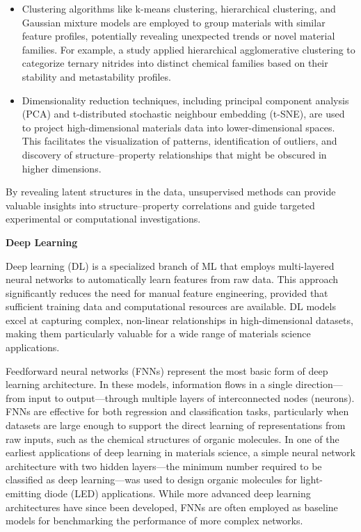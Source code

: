 \begin{itemize}
    \item Clustering algorithms like k-means clustering, hierarchical clustering, and Gaussian mixture models are employed to group materials with similar feature profiles, potentially revealing unexpected trends or novel material families\cite{RN571,RN555}. For example, a study applied hierarchical agglomerative clustering to categorize ternary nitrides into distinct chemical families based on their stability and metastability profiles\cite{RN555}.
    \item Dimensionality reduction techniques, including principal component analysis (PCA) and t-distributed stochastic neighbour embedding (t-SNE), are used to project high-dimensional materials data into lower-dimensional spaces. This facilitates the visualization of patterns, identification of outliers, and discovery of structure–property relationships that might be obscured in higher dimensions\cite{RN412,RN574,RN551}.
\end{itemize}

By revealing latent structures in the data, unsupervised methods can provide valuable insights into structure–property correlations and guide targeted experimental or computational investigations.

\textbf{Deep Learning}

Deep learning (DL) is a specialized branch of ML that employs multi-layered neural networks to automatically learn features from raw data. This approach significantly reduces the need for manual feature engineering, provided that sufficient training data and computational resources are available. DL models excel at capturing complex, non-linear relationships in high-dimensional datasets, making them particularly valuable for a wide range of materials science applications.

Feedforward neural networks (FNNs) represent the most basic form of deep learning architecture. In these models, information flows in a single direction—from input to output—through multiple layers of interconnected nodes (neurons). FNNs are effective for both regression and classification tasks, particularly when datasets are large enough to support the direct learning of representations from raw inputs, such as the chemical structures of organic molecules\cite{RN581,RN610}. In one of the earliest applications of deep learning in materials science, a simple neural network architecture with two hidden layers—the minimum number required to be classified as deep learning—was used to design organic molecules for light-emitting diode (LED) applications\cite{RN66}. While more advanced deep learning architectures have since been developed, FNNs are often employed as baseline models for benchmarking the performance of more complex networks.


